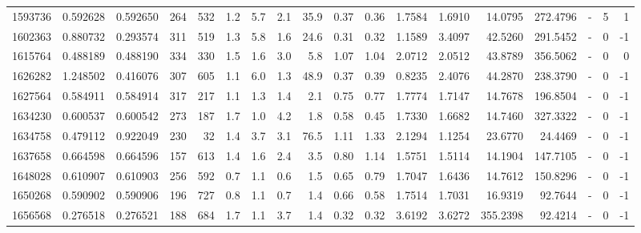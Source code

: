 \begin{tabular}{rrrrrrrrrrrrrrrlrr}
   1593736 & 0.592628 &   0.592650 &  264 &  532 &      1.2 &      5.7 &     2.1 &     35.9 &       0.37 &        0.36 &  1.7584 &  1.6910 &   14.0795 &  272.4796 &             - &        5 &          1 \\
   1602363 & 0.880732 &   0.293574 &  311 &  519 &      1.3 &      5.8 &     1.6 &     24.6 &       0.31 &        0.32 &  1.1589 &  3.4097 &   42.5260 &  291.5452 &             - &        0 &         -1 \\
   1615764 & 0.488189 &   0.488190 &  334 &  330 &      1.5 &      1.6 &     3.0 &      5.8 &       1.07 &        1.04 &  2.0712 &  2.0512 &   43.8789 &  356.5062 &             - &        0 &          0 \\
   1626282 & 1.248502 &   0.416076 &  307 &  605 &      1.1 &      6.0 &     1.3 &     48.9 &       0.37 &        0.39 &  0.8235 &  2.4076 &   44.2870 &  238.3790 &             - &        0 &         -1 \\
   1627564 & 0.584911 &   0.584914 &  317 &  217 &      1.1 &      1.3 &     1.4 &      2.1 &       0.75 &        0.77 &  1.7774 &  1.7147 &   14.7678 &  196.8504 &             - &        0 &         -1 \\
   1634230 & 0.600537 &   0.600542 &  273 &  187 &      1.7 &      1.0 &     4.2 &      1.8 &       0.58 &        0.45 &  1.7330 &  1.6682 &   14.7460 &  327.3322 &             - &        0 &         -1 \\
   1634758 & 0.479112 &   0.922049 &  230 &   32 &      1.4 &      3.7 &     3.1 &     76.5 &       1.11 &        1.33 &  2.1294 &  1.1254 &   23.6770 &   24.4469 &             - &        0 &         -1 \\
   1637658 & 0.664598 &   0.664596 &  157 &  613 &      1.4 &      1.6 &     2.4 &      3.5 &       0.80 &        1.14 &  1.5751 &  1.5114 &   14.1904 &  147.7105 &             - &        0 &         -1 \\
   1648028 & 0.610907 &   0.610903 &  256 &  592 &      0.7 &      1.1 &     0.6 &      1.5 &       0.65 &        0.79 &  1.7047 &  1.6436 &   14.7612 &  150.8296 &             - &        0 &         -1 \\
   1650268 & 0.590902 &   0.590906 &  196 &  727 &      0.8 &      1.1 &     0.7 &      1.4 &       0.66 &        0.58 &  1.7514 &  1.7031 &   16.9319 &   92.7644 &             - &        0 &         -1 \\
   1656568 & 0.276518 &   0.276521 &  188 &  684 &      1.7 &      1.1 &     3.7 &      1.4 &       0.32 &        0.32 &  3.6192 &  3.6272 &  355.2398 &   92.4214 &             - &        0 &         -1 \\

\end{tabular}
